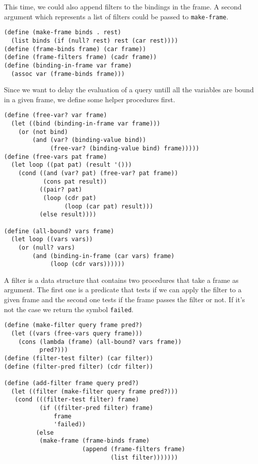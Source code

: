 \documentclass[a4paper,12pt]{article}
\begin{document}
This time, we could also append filters to the bindings in the frame.
A second argument which represents a list of filters could be passed
to \lstinline!make-frame!.

\begin{lstlisting}
(define (make-frame binds . rest)
  (list binds (if (null? rest) rest (car rest))))
(define (frame-binds frame) (car frame))
(define (frame-filters frame) (cadr frame))
(define (binding-in-frame var frame)
  (assoc var (frame-binds frame)))
\end{lstlisting}

Since we want to delay the evaluation of a query untill all the
variables are bound in a given frame, we define some helper procedures
first.

\begin{lstlisting}
(define (free-var? var frame)
  (let ((bind (binding-in-frame var frame)))
    (or (not bind)
        (and (var? (binding-value bind))
             (free-var? (binding-value bind) frame)))))
(define (free-vars pat frame)
  (let loop ((pat pat) (result '()))
    (cond ((and (var? pat) (free-var? pat frame))
           (cons pat result))
          ((pair? pat)
           (loop (cdr pat)
                 (loop (car pat) result)))
          (else result))))

(define (all-bound? vars frame)
  (let loop ((vars vars))
    (or (null? vars)
        (and (binding-in-frame (car vars) frame)
             (loop (cdr vars))))))

\end{lstlisting}

A filter is a data structure that contains two procedures that take a
frame as argument.  The first one is a predicate that tests if we can
apply the filter to a given frame and the second one tests if the
frame passes the filter or not.  If it's not the case we return the
symbol \lstinline!failed!.

\begin{lstlisting}
(define (make-filter query frame pred?)
  (let ((vars (free-vars query frame)))
    (cons (lambda (frame) (all-bound? vars frame))
          pred?)))
(define (filter-test filter) (car filter))
(define (filter-pred filter) (cdr filter))

(define (add-filter frame query pred?)
  (let ((filter (make-filter query frame pred?)))
   (cond (((filter-test filter) frame)
          (if ((filter-pred filter) frame)
              frame
              'failed))
         (else
          (make-frame (frame-binds frame)
                      (append (frame-filters frame)
                              (list filter)))))))
\end{lstlisting}
\end{document}
